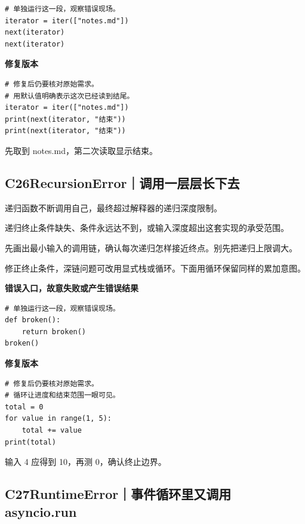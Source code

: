 \documentclass[UTF8,a4paper,oneside,openany,fontset=none,11pt]{ctexbook}
\newcommand{\code}[1]{\texttt{\detokenize{#1}}}
\newcommand{\CaseStep}[2]{\par\smallskip{\bfseries\color{Muted}#1}\enspace #2\par}
\begin{document}
\begin{lstlisting}[style=errorcode,title={错误复现（故意失败或错误结果）：\code{case_25_bad.py.txt}}]
# 单独运行这一段，观察错误现场。
iterator = iter(["notes.md"])
next(iterator)
next(iterator)
\end{lstlisting}

\textbf{修复版本}

\begin{lstlisting}[title={\code{case_25.py}}]
# 修复后仍要核对原始需求。
# 用默认值明确表示这次已经读到结尾。
iterator = iter(["notes.md"])
print(next(iterator, "结束"))
print(next(iterator, "结束"))
\end{lstlisting}

\CaseStep{复验}{先取到 notes.md，第二次读取显示结束。}

\subsection*{C26\enspace RecursionError｜调用一层层长下去}

\CaseStep{现象}{递归函数不断调用自己，最终超过解释器的递归深度限制。}

\CaseStep{原因}{递归终止条件缺失、条件永远达不到，或输入深度超出这套实现的承受范围。}

\CaseStep{排查}{先画出最小输入的调用链，确认每次递归怎样接近终点。别先把递归上限调大。}

\CaseStep{修复}{修正终止条件，深链问题可改用显式栈或循环。下面用循环保留同样的累加意图。}

\textbf{错误入口，故意失败或产生错误结果}

\begin{lstlisting}[style=errorcode,title={错误复现（故意失败或错误结果）：\code{case_26_bad.py.txt}}]
# 单独运行这一段，观察错误现场。
def broken():
    return broken()
broken()
\end{lstlisting}

\textbf{修复版本}

\begin{lstlisting}[title={\code{case_26.py}}]
# 修复后仍要核对原始需求。
# 循环让进度和结束范围一眼可见。
total = 0
for value in range(1, 5):
    total += value
print(total)
\end{lstlisting}

\CaseStep{复验}{输入 4 应得到 10，再测 0，确认终止边界。}

\subsection*{C27\enspace RuntimeError｜事件循环里又调用 asyncio.run}
\end{document}
